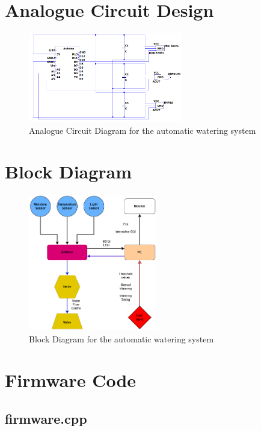 \documentclass[a4paper,11pt]{article}
\begin{document}
\section{Analogue Circuit Design}
\begin{figure}[H]
    \centering
    \includegraphics[width=0.6\textwidth]{Analogue Circuit Diagram.png}
    \caption{Analogue Circuit Diagram for the automatic watering system}
    \label{fig:Analogue_Circuit_Diagram_for_the_automatic_watering_system}
\end{figure}

\section{Block Diagram}
\begin{figure}[H]
    \centering
    \includegraphics[width=0.5\textwidth]{DataLogger Block Diagram2.png}
    \caption{Block Diagram for the automatic watering system}
    \label{fig:Block_Diagram_for_the_automatic_watering_system}
\end{figure}


\section{Firmware Code}
\subsection{firmware.cpp}

\end{document}
